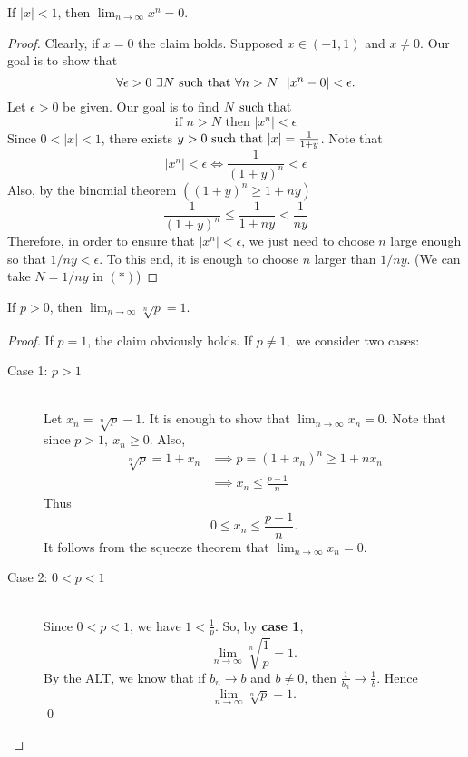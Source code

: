 \begin{theorem}
    \label{thm3.20e}
    If $|x| < 1$, then $\lim_{n\to \infty}x^n = 0.$
\end{theorem}
\begin{proof}
    Clearly, if $x=0$ the claim holds. Supposed $x\in (-1,1)$ and $x\not = 0$. Our goal is to show that 
    $$\forall \epsilon > 0 ~\exists N \text{ such that } \forall n > N ~~|x^n -0| < \epsilon.$$
    Let $\epsilon > 0$ be given. Our goal is to find $N \text{ such that }$
    \begin{equation*}
        \text{if $n > N$ then $|x^n| < \epsilon$} \tag{$*$}
    \end{equation*}
    Since $0 < |x| < 1$, there exists $y > 0 \text{ such that } |x| = \frac{1}{1+y}$. Note that
    $$|x^n| < \epsilon \iff \frac{1}{(1+y)^n} < \epsilon$$
    Also, by the binomial theorem $((1+y)^n \geq 1 + ny)$
    $$\frac{1}{(1+y)^n} \leq \frac{1}{1+ny} < \frac{1}{ny}$$
    Therefore, in order to ensure that $|x^n| < \epsilon$, we just need to choose $n$ large enough so that $1/ny < \epsilon$. To this end, it is enough to choose $n$ larger than $1/ny$. (We can take $N= 1/ny$ in $(*)$)
\end{proof}

\begin{theorem}
    \label{thm3.20b}
    If $p > 0$, then $\lim_{n\to\infty} \sqrt[n]{p} =1$.
\end{theorem}
\begin{proof}
    If $p=1$, the claim obviously holds. If $p \not = 1,$ we consider two cases:
    \begin{description}
        \item[Case 1: $p > 1$] \leavevmode \\
        Let $x_n = \sqrt[n]{p} - 1.$ It is enough to show that $\lim_{n\to\infty}x_n = 0.$ Note that since $p > 1, ~x_n \geq 0.$ Also,
        \begin{align*}
            \sqrt[n]{p} = 1 + x_n &\implies p = (1+x_n)^n \geq 1 + nx_n \\
            &\implies x_n \leq \frac{p-1}{n}
        \end{align*}
        Thus
        $$0 \leq x_n \leq \frac{p-1}{n}.$$
        It follows from the squeeze theorem that $\lim_{n\to \infty} x_n = 0.$

        \item[Case 2: $0 < p < 1$] \leavevmode \\
        Since $0 < p < 1$, we have $1 < \frac{1}{p}$. So, by \textbf{case 1},
        $$ \lim_{n\to\infty} \sqrt[n]{\frac{1}{p}} = 1.$$
        By the ALT, we know that if $b_n \to b$ and $b \not = 0$, then $\frac{1}{b_n} \to \frac{1}{b}.$ Hence
        $$\lim_{n\to\infty}\sqrt[n]{p} = 1.$$
        \qed
    \end{description}
\end{proof}

